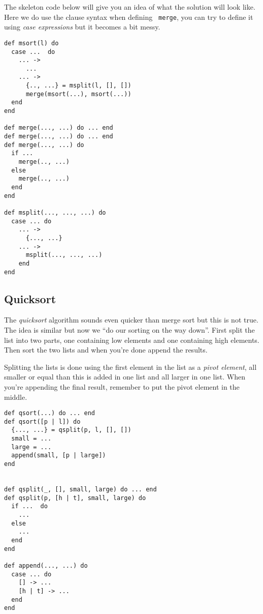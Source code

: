 \documentclass[a4paper,11pt]{article}
\begin{document}
The skeleton code below will give you an idea of what the solution
will look like. Here we do use the clause syntax when defining {\tt
  merge}, you can try to define it using {\em case expressions} but it
becomes a bit messy.

\pagebreak

\begin{verbatim}
def msort(l) do
  case ...  do
    ... -> 
      ...
    ... ->
      {.., ...} = msplit(l, [], [])
      merge(msort(...), msort(...))
  end
end

def merge(..., ...) do ... end
def merge(..., ...) do ... end
def merge(..., ...) do
  if ...
    merge(.., ...)
  else 
    merge(.., ...)
  end
end

def msplit(..., ..., ...) do
  case ... do
    ... -> 
      {..., ...}
    ... ->
      msplit(..., ..., ...)
    end
end
\end{verbatim}


\subsection{Quicksort}

The {\em quicksort} algorithm sounds even quicker than merge sort but
this is not true. The idea is similar but now we ``do our sorting on
the way down''. First split the list into two parts, one containing low
elements and one containing high elements. Then sort the two lists and
when you're done append the results. 

Splitting the lists is done using the first element in the list as a
{\em pivot element}, all smaller or equal than this is added in one
list and all larger in one list. When you're appending the final
result, remember to put the pivot element in the middle.

\begin{verbatim}
def qsort(...) do ... end
def qsort([p | l]) do 
  {..., ...} = qsplit(p, l, [], [])
  small = ...
  large = ...
  append(small, [p | large])
end


def qsplit(_, [], small, large) do ... end
def qsplit(p, [h | t], small, large) do
  if ...  do
    ...
  else
    ...
  end
end

def append(..., ...) do
  case ... do
    [] -> ...
    [h | t] -> ...
  end
end
\end{verbatim}


\end{document}
